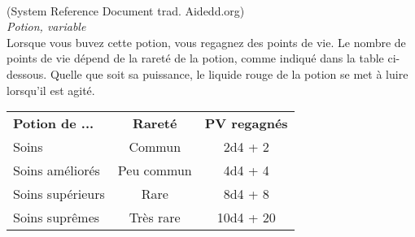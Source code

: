 \\
{\small (System Reference Document trad. Aidedd.org)}\\
{\small \it Potion, variable} \\

Lorsque vous buvez cette potion, vous regagnez des points de vie. Le nombre de points de vie dépend de la rareté de la potion, comme indiqué dans la table ci-dessous. Quelle que soit sa puissance, le liquide rouge de la potion se met à luire lorsqu'il est agité.

\begin{center}
\setlength{\tabcolsep}{4pt}
\begin{tabular}{lcc}
\bf Potion de ... & \bf Rareté & \bf PV regagnés \\
   \rowcolor{LightCyan}
Soins             & Commun     & 2d4 + 2 \\
Soins améliorés   & Peu commun & 4d4 + 4 \\
   \rowcolor{LightCyan}
Soins supérieurs  & Rare       & 8d4 + 8 \\
Soins suprêmes    & Très rare  & 10d4 + 20 \\
\end{tabular}
\end{center}

